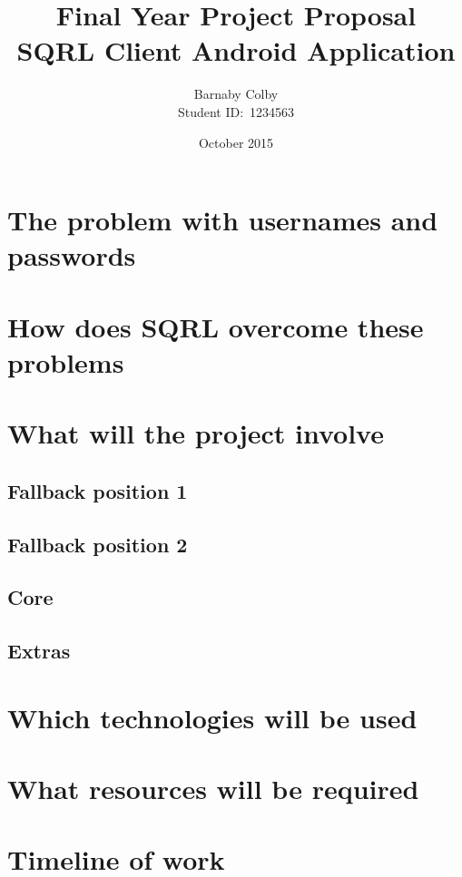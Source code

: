 \documentclass[a4paper,11pt]{article} %
\begin{document}
\title{Final Year Project Proposal\\SQRL Client Android Application}
\author{Barnaby Colby\\
Student ID:\ 1234563}
\date{October 2015}
\maketitle



\section*{The problem with usernames and passwords} 
\section*{How does SQRL overcome these problems} 
\section*{What will the project involve} 
    \subsection*{Fallback position 1} 
    \subsection*{Fallback position 2} 
    \subsection*{Core} 
    \subsection*{Extras} 
\section*{Which technologies will be used} 
\section*{What resources will be required} 
\section*{Timeline of work} 
\end{document}
